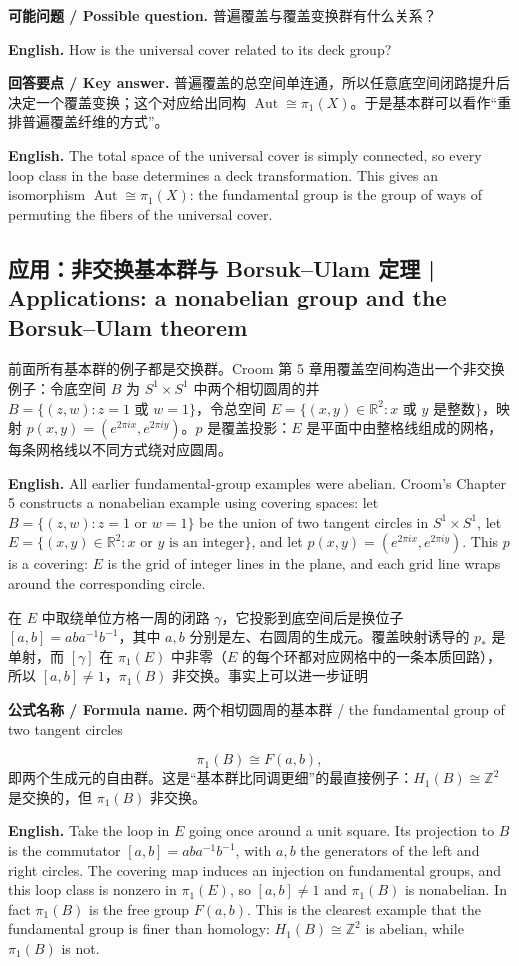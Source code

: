 \documentclass[UTF8,11pt,a4paper]{ctexart}
\newcommand{\EN}[1]{\par\noindent\textbf{English.} #1\par}
\newcommand{\FORMULA}[2]{\par\noindent\textbf{公式名称 / Formula name.} #1 / #2\par}
\newcommand{\ASK}[4]{\par\noindent\textbf{可能问题 / Possible question.} #1\par\EN{#2}\noindent\textbf{回答要点 / Key answer.} #3\par\EN{#4}\medskip}
\begin{document}
\ASK{普遍覆盖与覆盖变换群有什么关系？}{How is the universal cover related to its deck group?}{普遍覆盖的总空间单连通，所以任意底空间闭路提升后决定一个覆盖变换；这个对应给出同构 $\operatorname{Aut}\cong\pi_1(X)$。于是基本群可以看作“重排普遍覆盖纤维的方式”。}{The total space of the universal cover is simply connected, so every loop class in the base determines a deck transformation. This gives an isomorphism $\operatorname{Aut}\cong\pi_1(X)$: the fundamental group is the group of ways of permuting the fibers of the universal cover.}

\subsection{应用：非交换基本群与 Borsuk--Ulam 定理 | Applications: a nonabelian group and the Borsuk--Ulam theorem}
\noindent 前面所有基本群的例子都是交换群。Croom 第 5 章用覆盖空间构造出一个非交换例子：令底空间 $B$ 为 $S^1\times S^1$ 中两个相切圆周的并 $B=\{(z,w):z=1\text{ 或 }w=1\}$，令总空间 $E=\{(x,y)\in\mathbb R^2:x\text{ 或 }y\text{ 是整数}\}$，映射 $p(x,y)=(e^{2\pi ix},e^{2\pi iy})$。$p$ 是覆盖投影：$E$ 是平面中由整格线组成的网格，每条网格线以不同方式绕对应圆周。
\EN{All earlier fundamental-group examples were abelian. Croom's Chapter 5 constructs a nonabelian example using covering spaces: let $B=\{(z,w):z=1\text{ or }w=1\}$ be the union of two tangent circles in $S^1\times S^1$, let $E=\{(x,y)\in\mathbb R^2:x\text{ or }y\text{ is an integer}\}$, and let $p(x,y)=(e^{2\pi ix},e^{2\pi iy})$. This $p$ is a covering: $E$ is the grid of integer lines in the plane, and each grid line wraps around the corresponding circle.}

\noindent 在 $E$ 中取绕单位方格一周的闭路 $\gamma$，它投影到底空间后是换位子 $[a,b]=aba^{-1}b^{-1}$，其中 $a,b$ 分别是左、右圆周的生成元。覆盖映射诱导的 $p_*$ 是单射，而 $[\gamma]$ 在 $\pi_1(E)$ 中非零（$E$ 的每个环都对应网格中的一条本质回路），所以 $[a,b]\ne1$，$\pi_1(B)$ 非交换。事实上可以进一步证明
\FORMULA{两个相切圆周的基本群}{the fundamental group of two tangent circles}
\[
\pi_1(B)\cong F(a,b),
\]
即两个生成元的自由群。这是“基本群比同调更细”的最直接例子：$H_1(B)\cong\mathbb Z^2$ 是交换的，但 $\pi_1(B)$ 非交换。
\EN{Take the loop in $E$ going once around a unit square. Its projection to $B$ is the commutator $[a,b]=aba^{-1}b^{-1}$, with $a,b$ the generators of the left and right circles. The covering map induces an injection on fundamental groups, and this loop class is nonzero in $\pi_1(E)$, so $[a,b]\ne1$ and $\pi_1(B)$ is nonabelian. In fact $\pi_1(B)$ is the free group $F(a,b)$. This is the clearest example that the fundamental group is finer than homology: $H_1(B)\cong\mathbb Z^2$ is abelian, while $\pi_1(B)$ is not.}
\end{document}

